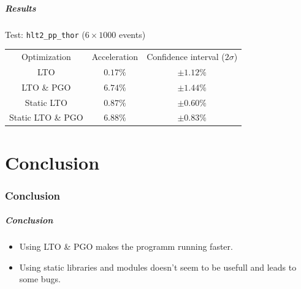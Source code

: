 \documentclass{beamer}
\begin{document}
    \begin{frame}[fragile]
        \frametitle{Results}

        Test: \verb'hlt2_pp_thor' ($6 \times 1000$ events)
        \begin{center}
            \begin{tabular}{ c c c }
                Optimization & Acceleration & Confidence interval ($2\sigma$) \\
                LTO & $0.17\%$ & $\pm 1.12\%$ \\
                LTO \& PGO & $6.74\%$ & $\pm 1.44\%$ \\
                Static LTO & $0.87\%$ & $\pm 0.60\%$ \\
                Static LTO \& PGO & $6.88\%$ & $\pm 0.83\%$
            \end{tabular}
        \end{center}
    \end{frame}

\part{Conclusion}
\section*{Conclusion}

    \begin{frame}
        \frametitle{Conclusion}

        \begin{itemize}
            \item Using LTO \& PGO makes the programm running faster.
            \item Using static libraries and modules doesn't seem to be usefull and leads to some bugs.
        \end{itemize}
    \end{frame}
\end{document}
